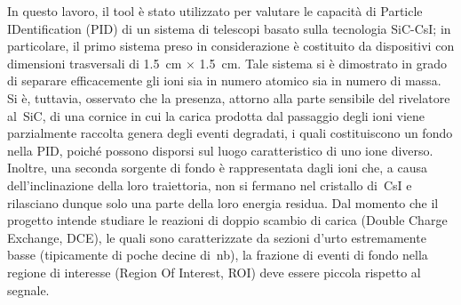 In questo lavoro, il tool è stato utilizzato per valutare le capacità di Particle IDentification (PID) di un sistema di telescopi basato sulla tecnologia SiC-CsI; in particolare, il primo sistema preso in considerazione è costituito da dispositivi con dimensioni trasversali di 1.5~cm $\times$ 1.5~cm.
Tale sistema si è dimostrato in grado di separare efficacemente gli ioni sia in numero atomico sia in numero di massa.
Si è, tuttavia, osservato che la presenza, attorno alla parte sensibile del rivelatore al~SiC, di una cornice in cui la carica prodotta dal passaggio degli ioni viene parzialmente raccolta genera degli eventi degradati, i quali costituiscono un fondo nella PID, poiché possono disporsi sul luogo caratteristico di uno ione diverso.
Inoltre, una seconda sorgente di fondo è rappresentata dagli ioni che, a causa dell'inclinazione della loro traiettoria, non si fermano nel cristallo di~CsI e rilasciano dunque solo una parte della loro energia residua.
Dal momento che il progetto intende studiare le reazioni di doppio scambio di carica (Double Charge Exchange, DCE), le quali sono caratterizzate da sezioni d'urto estremamente basse (tipicamente di poche decine di~nb), la frazione di eventi di fondo nella regione di interesse (Region Of Interest, ROI) deve essere piccola rispetto al segnale.
